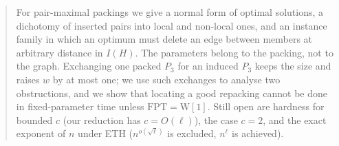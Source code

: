\documentclass[11pt]{article}
\theoremstyle{definition}
\theoremstyle{remark}
\begin{document}
\begin{abstract}
For pair-maximal packings we give a normal form of optimal solutions, a dichotomy of inserted pairs into local and non-local ones, and an instance family in which an optimum must delete an edge between members at arbitrary distance in $I(H)$.
The parameters belong to the packing, not to the graph. Exchanging one packed $P_3$ for an induced $P_3$ keeps the size and raises $w$ by at most one; we use such exchanges to analyse two obstructions, and we show that locating a good repacking cannot be done in fixed-parameter time unless $\mathrm{FPT}=\mathrm{W[1]}$.
Still open are hardness for bounded $c$ (our reduction has $c=O(\ell)$), the case $c=2$, and the exact exponent of $n$ under ETH ($n^{o(\sqrt\ell)}$ is excluded, $n^{\ell}$ is achieved).
\end{abstract}












\appendix












\end{document}

